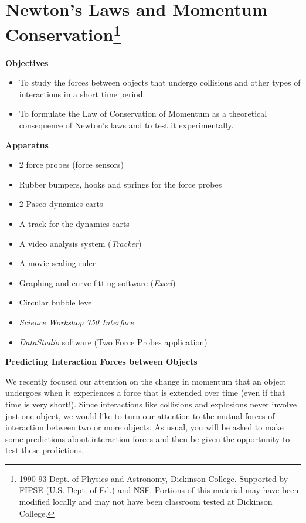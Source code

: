 
\section{Newton's Laws and Momentum Conservation\footnote{
1990-93 Dept. of Physics and Astronomy, Dickinson College. Supported by FIPSE
(U.S. Dept. of Ed.) and NSF. Portions of this material may have been modified
locally and may not have been classroom tested at Dickinson College.
}}

\makelabheader %

\textbf{Objectives }

\begin{itemize}
\item To study the forces between objects that undergo collisions and other types
of interactions in a short time period. 
\item To formulate the Law of Conservation of Momentum as a theoretical consequence
of Newton's laws and to test it experimentally.
\end{itemize}
\textbf{Apparatus}

\begin{itemize}
\item 2 force probes (force sensors)
\item Rubber bumpers, hooks and springs for the force probes
\item 2 Pasco dynamics carts
\item A track for the dynamics carts
\item A video analysis system (\textit{Tracker})
\item A movie scaling ruler
\item Graphing and curve fitting software (\textit{Excel})
\item Circular bubble level
\item \textit{Science Workshop 750 Interface}
\item \textit{DataStudio} software (Two Force Probes application)
\end{itemize}
\textbf{Predicting Interaction Forces between Objects} 

We recently focused our attention on the change in momentum that an object undergoes
when it experiences a force that is extended over time (even if that time is
very short!). Since interactions like collisions and explosions never involve
just one object, we would like to turn our attention to the mutual forces of
interaction between two or more objects. As usual, you will be asked to make
some predictions about interaction forces and then be given the opportunity
to test these predictions. 

